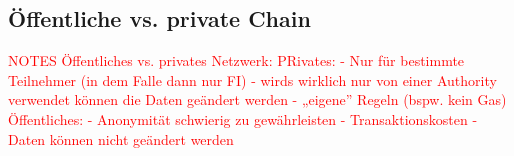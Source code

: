 \noindent

\subsection{Öffentliche vs. private Chain}
\label{sec:oeffentlich-vs-privates-netzwerk}


\begin{flushleft}
    
    \textcolor{red}{NOTES Öffentliches vs. privates Netzwerk:\break
    PRivates:\break
    - Nur für bestimmte Teilnehmer (in dem Falle dann nur FI)\break
    - wirds wirklich nur von einer Authority verwendet können die Daten geändert werden\break
    - „eigene” Regeln (bspw. kein Gas)\break
    Öffentliches:\break
    - Anonymität schwierig zu gewährleisten\break
    - Transaktionskosten\break
    - Daten können nicht geändert werden\break}
\end{flushleft}

